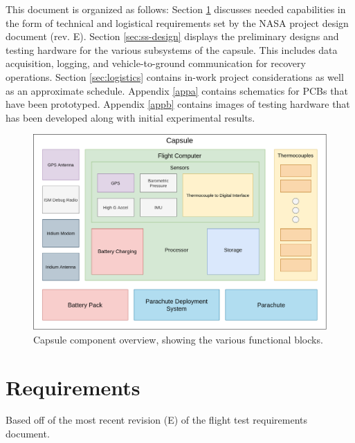 \documentclass{article}
\newcommand{\ddrev}{E}
\begin{document}
This document is organized as follows: Section \ref{sec:requirements} discusses needed capabilities in the form of technical and logistical requirements set by the NASA project design document (rev. \ddrev ). Section \ref{sec:ss-design} displays the preliminary designs and testing hardware for the various subsystems of the capsule. This includes data acquisition, logging, and vehicle-to-ground communication for recovery operations. Section \ref{sec:logistics} contains in-work project considerations as well as an approximate schedule. Appendix \ref{appa} contains schematics for PCBs that have been prototyped. Appendix \ref{appb} contains images of testing hardware that has been developed along with initial experimental results. 

\begin{figure}[h!]
	\centering
	\includegraphics[width=\textwidth]{images/amtps-avionics.png}
	\caption{Capsule component overview, showing the various functional blocks.}
	\label{fig:capsule-overview}
\end{figure}


\section{Requirements}
\label{sec:requirements}
Based off of the most recent revision (\ddrev) of the flight test requirements document.
\end{document}

